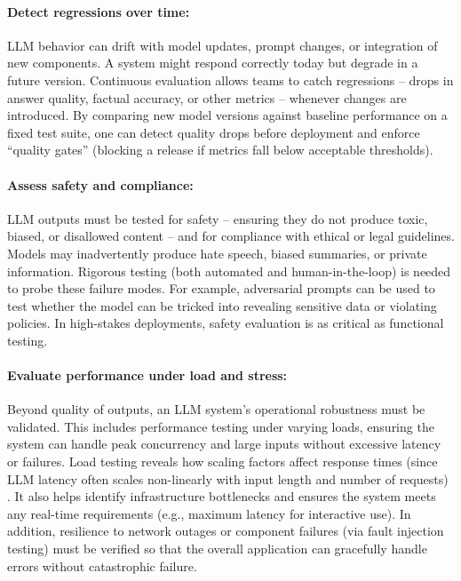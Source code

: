 \paragraph*{Detect regressions over time:}
LLM behavior can drift with model updates, prompt changes, or integration of new components. A system might respond correctly today but degrade in a future version. Continuous evaluation allows teams to catch regressions – drops in answer quality, factual accuracy, or other metrics – whenever changes are introduced. By comparing new model versions against baseline performance on a fixed test suite, one can detect quality drops before deployment and enforce “quality gates” (blocking a release if metrics fall below acceptable thresholds).

\paragraph*{Assess safety and compliance:}
LLM outputs must be tested for safety – ensuring they do not produce toxic, biased, or disallowed content – and for compliance with ethical or legal guidelines. Models may inadvertently produce hate speech, biased summaries, or private information. Rigorous testing (both automated and human-in-the-loop) is needed to probe these failure modes. For example, adversarial prompts can be used to test whether the model can be tricked into revealing sensitive data or violating policies. In high-stakes deployments, safety evaluation is as critical as functional testing.

\paragraph*{Evaluate performance under load and stress:}
Beyond quality of outputs, an LLM system’s operational robustness must be validated. This includes performance testing under varying loads, ensuring the system can handle peak concurrency and large inputs without excessive latency or failures. Load testing reveals how scaling factors affect response times (since LLM latency often scales non-linearly with input length and number of requests) \cite{posta1}. It also helps identify infrastructure bottlenecks and ensures the system meets any real-time requirements (e.g., maximum latency for interactive use). In addition, resilience to network outages or component failures (via fault injection testing) must be verified so that the overall application can gracefully handle errors without catastrophic failure.

